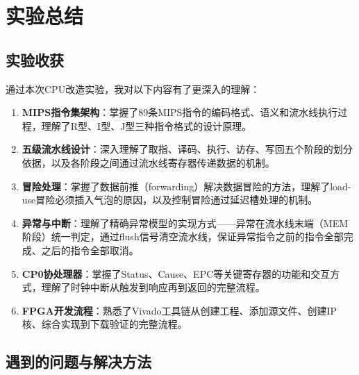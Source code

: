 \section{实验总结}

\subsection{实验收获}

通过本次CPU改造实验，我对以下内容有了更深入的理解：

\begin{enumerate}[leftmargin=2em]
    \item \textbf{MIPS指令集架构}：掌握了89条MIPS指令的编码格式、语义和流水线执行过程，理解了R型、I型、J型三种指令格式的设计原理。

    \item \textbf{五级流水线设计}：深入理解了取指、译码、执行、访存、写回五个阶段的划分依据，以及各阶段之间通过流水线寄存器传递数据的机制。

    \item \textbf{冒险处理}：掌握了数据前推（forwarding）解决数据冒险的方法，理解了load-use冒险必须插入气泡的原因，以及控制冒险通过延迟槽处理的机制。

    \item \textbf{异常与中断}：理解了精确异常模型的实现方式——异常在流水线末端（MEM阶段）统一判定，通过flush信号清空流水线，保证异常指令之前的指令全部完成、之后的指令全部取消。

    \item \textbf{CP0协处理器}：掌握了Status、Cause、EPC等关键寄存器的功能和交互方式，理解了时钟中断从触发到响应再到返回的完整流程。

    \item \textbf{FPGA开发流程}：熟悉了Vivado工具链从创建工程、添加源文件、创建IP核、综合实现到下载验证的完整流程。
\end{enumerate}

\subsection{遇到的问题与解决方法}

